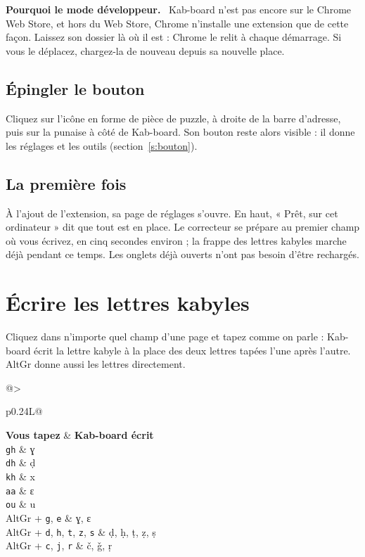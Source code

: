 \documentclass[11pt,a4paper]{article}
\makeatletter
\newcommand{\touche}[1]{\texttt{#1}}
\newenvironment{encadre}[2][]{\par\medskip\noindent\textbf{#2.}\ }{\par\medskip}
\newcommand{\tableau}[3]{%
  \par\noindent\begin{tabularx}{\linewidth}{@{}>{\raggedright\arraybackslash}p{#1}L@{}}
  \toprule #2 \\ \midrule #3 \bottomrule
  \end{tabularx}\par}
\makeatother
\begin{document}
\begin{encadre}{Pourquoi le mode développeur}
Kab-board n'est pas encore sur le Chrome Web Store, et hors du Web Store, Chrome n'installe une extension que de cette façon. Laissez son dossier là où il est : Chrome le relit à chaque démarrage. Si vous le déplacez, chargez-la de nouveau depuis sa nouvelle place.
\end{encadre}

\FloatBarrier
\subsection{Épingler le bouton}
Cliquez sur l'icône en forme de pièce de puzzle, à droite de la barre d'adresse, puis sur la punaise à côté de Kab-board. Son bouton reste alors visible : il donne les réglages et les outils (section~\ref{s:bouton}).

\subsection{La première fois}
À l'ajout de l'extension, sa page de réglages s'ouvre. En haut, « Prêt, sur cet ordinateur » dit que tout est en place. Le correcteur se prépare au premier champ où vous écrivez, en cinq secondes environ ; la frappe des lettres kabyles marche déjà pendant ce temps. Les onglets déjà ouverts n'ont pas besoin d'être rechargés.

\section{Écrire les lettres kabyles}\label{s:lettres}
Cliquez dans n'importe quel champ d'une page et tapez comme on parle : Kab-board écrit la lettre kabyle à la place des deux lettres tapées l'une après l'autre. AltGr donne aussi les lettres directement.

\medskip
\tableau{0.24\linewidth}{\textbf{Vous tapez} & \textbf{Kab-board écrit}}{%
\touche{gh} & ɣ \\
\touche{dh} & ḍ \\
\touche{kh} & x \\
\touche{aa} & ɛ \\
\touche{ou} & u \\
AltGr + \touche{g}, \touche{e} & ɣ, ɛ \\
AltGr + \touche{d}, \touche{h}, \touche{t}, \touche{z}, \touche{s} & ḍ, ḥ, ṭ, ẓ, ṣ \\
AltGr + \touche{c}, \touche{j}, \touche{r} & č, ǧ, ṛ \\}
\end{document}
